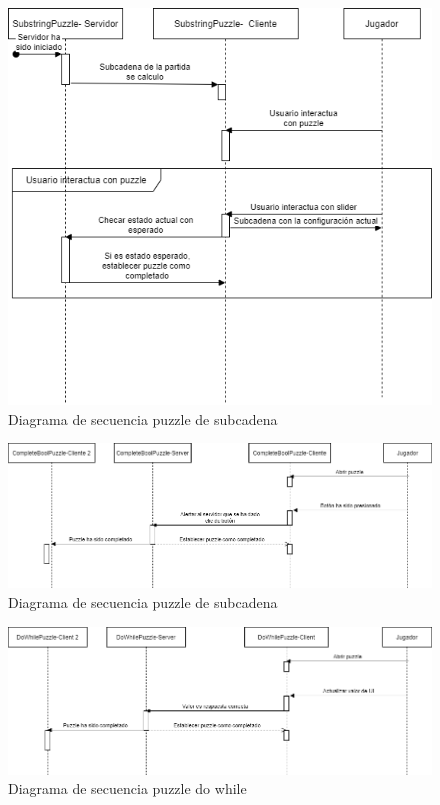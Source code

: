         \begin{figure}[H]
        \centering
        \includegraphics[width=0.8\linewidth]{images/DiagramaSecuenciaPuzzleSubstring.png}
        \caption{Diagrama de secuencia puzzle de subcadena}
        \label{fig:diagrama_sec_subcadena}
    \end{figure}
        \begin{figure}[H]
        \centering
        \includegraphics[width=0.8\linewidth]{images/DiagramaSecuenciaPuzzleBool.png}
        \caption{Diagrama de secuencia puzzle de subcadena}
        \label{fig:diagrama_sec_booleano}
    \end{figure}
        \begin{figure}[H]
        \centering
        \includegraphics[width=0.8\linewidth]{images/DiagramaSecuenciaPuzzleDoWhile.png}
        \caption{Diagrama de secuencia puzzle do while}
        \label{fig:diagrama_sec_do_while}
    \end{figure}
